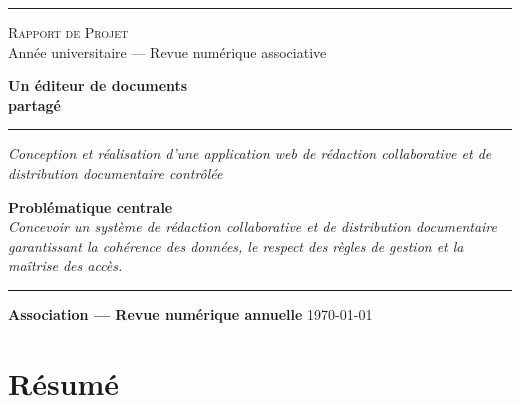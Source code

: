 \documentclass[11pt,a4paper]{report}
\begin{document}
\begin{titlepage}
    \centering
    \vspace*{0.5cm}
    {\color{violetprincipal}\rule{\linewidth}{3pt}}
    \vspace{0.8cm}
    {\Large\color{violetclair}\textsc{Rapport de Projet}}\\[0.3cm]
    {\large\color{violetfonce}Année universitaire --- Revue numérique associative}
    \vspace{2cm}
    {\Huge\bfseries\color{violetprincipal}
    Un éditeur de documents\\[0.3cm]
    partagé\par}
    \vspace{1cm}
    {\color{violetaccent}\rule{0.6\linewidth}{1.5pt}}
    \vspace{1cm}
    \begin{minipage}{0.85\linewidth}
        \centering
        \large\color{violetfonce}
        \textit{Conception et réalisation d'une application web de rédaction collaborative et de distribution documentaire contrôlée}
    \end{minipage}
    \vspace{2cm}
    \begin{tcolorbox}[
        colback=violettresclair, colframe=violetprincipal,
        boxrule=1pt, arc=5pt, width=0.85\linewidth,
        halign=center, top=10pt, bottom=10pt
    ]
        \centering
        \color{violetfonce}\textbf{Problématique centrale}\\[0.4cm]
        \itshape\color{black}
        Concevoir un système de rédaction collaborative et de distribution
        documentaire garantissant la cohérence des données, le respect des
        règles de gestion et la maîtrise des accès.
    \end{tcolorbox}
    \vfill
    {\color{violetprincipal}\rule{\linewidth}{2pt}}
    \vspace{0.4cm}
    {\large\color{violetprincipal}\textbf{Association --- Revue numérique annuelle}}
    \vspace{0.3cm}
    {\color{violetclair}\today}
\end{titlepage}

\setcounter{page}{1}

\chapter*{Résumé}
\end{document}

